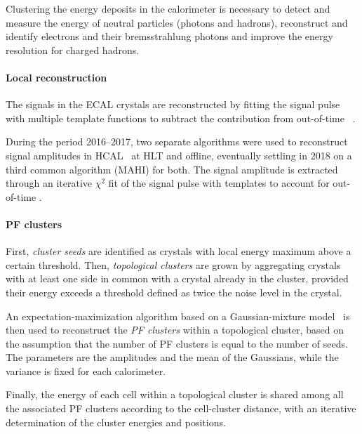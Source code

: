 \label{sec:clusters}
Clustering the energy deposits in the calorimeter is necessary to
detect and measure the energy of neutral particles (photons and hadrons),
reconstruct and identify electrons and their bremsstrahlung photons
and improve the energy resolution for charged hadrons.

\paragraph{Local reconstruction\\}

The signals in the ECAL crystals are reconstructed by fitting the signal pulse
with multiple template functions to subtract the contribution from out-of-time \pileup~\cite{CMS-EGM-18-001}.

During the period 2016--2017, two separate algorithms were used
to reconstruct signal amplitudes in HCAL~\cite{CMS-PRF-22-001} at HLT and offline,
eventually settling in 2018 on a third common algorithm (MAHI) for both.
The signal amplitude is extracted through an iterative $\chi^2$ fit of the signal pulse
with templates to account for out-of-time \pileup.

\paragraph{PF clusters\\}
First, \textit{cluster seeds} are identified as crystals with local energy maximum above a certain threshold.
Then, \textit{topological clusters} are grown by aggregating crystals with at least one side in common with a crystal already in the cluster,
provided their energy exceeds a threshold defined as twice the noise level in the crystal.

An expectation-maximization algorithm based on a Gaussian-mixture model~\cite{CMS-NOTE-2005-001}
is then used to reconstruct the \textit{PF clusters} within a topological cluster,
based on the assumption that the number of PF clusters is equal to the number of seeds.
The parameters are the amplitudes and the mean of the Gaussians, while the variance is fixed for each calorimeter.

Finally, the energy of each cell within a topological cluster is shared among all the associated PF clusters according to the cell-cluster distance,
with an iterative determination of the cluster energies and positions.
